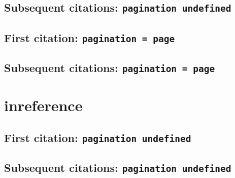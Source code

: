 \documentclass[a4paper]{article}
\begin{document}
\cite{dahn+liefeld:see+vision+eye}

\citereset
\cite[577]{dahn+liefeld:see+vision+eye}

\citereset
\cite[note]{dahn+liefeld:see+vision+eye}

\subsection{Subsequent citations: \texttt{pagination undefined}}

\cite{dahn+liefeld:see+vision+eye}

\cite[577]{dahn+liefeld:see+vision+eye}

\AtNextCite{\renewcommand*{\volcitedelim}{\addcomma\space}}
\cite[note]{dahn+liefeld:see+vision+eye}

\subsection{First citation: \texttt{pagination = page}}

\cite{dahn+liefeld:see+vision+eye:a}

\citereset
\cite[577]{dahn+liefeld:see+vision+eye:a}

\citereset
\cite[note]{dahn+liefeld:see+vision+eye:a}

\subsection{Subsequent citations: \texttt{pagination = page}}

\cite{dahn+liefeld:see+vision+eye:a}

\cite[577]{dahn+liefeld:see+vision+eye:a}

\cite[note]{dahn+liefeld:see+vision+eye:a}

\section{inreference}

\subsection{First citation: \texttt{pagination undefined}}

\cite{olson:2003}

\citereset
\cite[577]{olson:2003}

\citereset
\cite[note]{olson:2003}

\subsection{Subsequent citations: \texttt{pagination undefined}}
\end{document}
